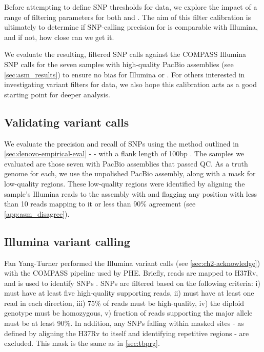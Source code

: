 Before attempting to define SNP thresholds for \ont{} data, we explore the impact of a range of filtering parameters for both \bcftools{} and \pandora{}. The aim of this filter calibration is ultimately to determine if SNP-calling precision for \ont{} is comparable with Illumina, and if not, how close can we get it.

We evaluate the resulting, filtered SNP calls against the COMPASS Illumina SNP calls for the seven samples with high-quality PacBio assemblies (see \autoref{sec:asm_results}) to ensure no bias for Illumina or \ont{}. For others interested in investigating variant filters for \ont{} data, we also hope this calibration acts as a good starting point for deeper analysis.

\subsection{Validating variant calls}
\label{sec:validate-var-calls}

We evaluate the precision and recall of SNPs using the method outlined in \autoref{sec:denovo-empirical-eval} -  - with a flank length of 100bp \cite{minos}. The samples we evaluated are those seven with PacBio assemblies that passed QC. As a truth genome for each, we use the unpolished \flye{} PacBio assembly, along with a mask for low-quality regions. These low-quality regions were identified by aligning the sample's Illumina reads to the assembly with  and flagging any position with less than 10 reads mapping to it or less than 90\% agreement (see \autoref{app:asm_disagree}). 

\subsection{Illumina variant calling}
\label{sec:illumina-var-call}

Fan Yang-Turner performed the Illumina variant calls (see \autoref{sec:ch2-acknowledge}) with the COMPASS pipeline used by PHE. Briefly, reads are mapped to H37Rv, and  is used to identify SNPs \cite{samtools2009}. SNPs are filtered based on the following criteria: i) must have at least five high-quality supporting reads, ii) must have at least one read in each direction, iii) 75\% of reads must be high-quality, iv) the diploid genotype must be homozygous, v) fraction of reads supporting the major allele must be at least 90\%. In addition, any SNPs falling within masked sites - as defined by aligning the H37Rv to itself and identifying repetitive regions \cite{tbmask2014} - are excluded. This mask is the same as in \autoref{sec:tbprg}.

